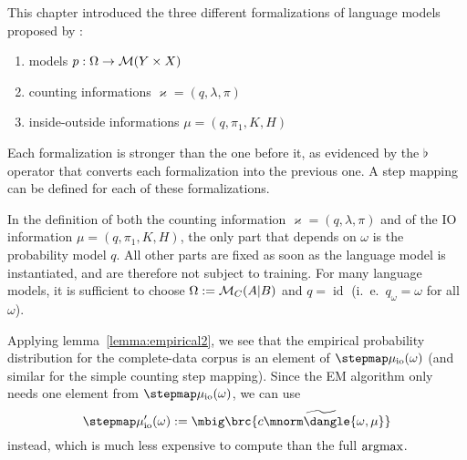 This chapter introduced the three different formalizations of language models
proposed by \cite{bucstuvog15}:
\begin{enumerate}
 \item models $p:\Omega\to\mathcal M(Y\times X)$
 \item counting informations $\varkappa=(q,\lambda,\pi)$
 \item inside-outside informations $\mu=(q,\pi_1,K,H)$
\end{enumerate}
Each formalization is stronger than the one before it, as evidenced by the
$\flat$ operator that converts each formalization into the previous one.
A step mapping can be defined for each of these formalizations.
\begin{center}\end{center}

In the definition of both the counting information $\varkappa=(q,\lambda,\pi)$
and of the IO information $\mu=(q,\pi_1,K,H)$, the only part that depends on
$\omega$ is the probability model $q$. All other parts are fixed as soon as the
language model is instantiated, and are therefore not subject to training. For
many language models, it is sufficient to choose $\Omega := \mathcal M_C(A|B)$ and $q
= \operatorname{id}$ (i.~e.~$q_\omega = \omega$ for all $\omega$).

Applying lemma~\ref{lemma:empirical2}, we see that the empirical probability
distribution for the complete-data corpus is an element of
$\stepmap\mu_\mathrm{io}(\omega)$ (and similar for the simple counting step
mapping). Since the EM algorithm only needs one element from
$\stepmap\mu_\mathrm{io}(\omega)$, we can use
\[
 \stepmap\mu'_\mathrm{io}(\omega) := \mbig\brc{ \widetilde{c\mnorm\dangle{\omega,\mu}} }
\]
instead, which is much less expensive to compute than the full $\argmax$.
